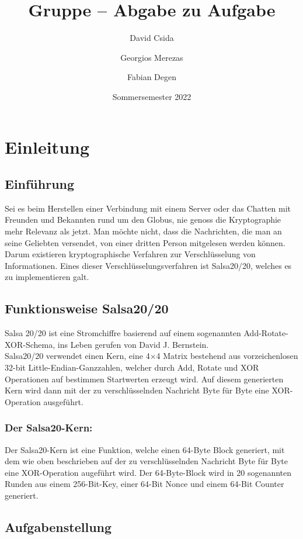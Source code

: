\documentclass[course=erap]{aspdoc}
\author{David Csida \and Georgios Merezas \and Fabian Degen}
\date{Sommersemester 2022} %
\title{Gruppe \theGroup{} -- Abgabe zu Aufgabe \theNumber}
\begin{document}
\maketitle

\section{Einleitung}
\subsection{Einführung}
Sei es beim Herstellen einer Verbindung mit einem Server oder das Chatten mit Freunden und Bekannten rund um den Globus, nie genoss die Kryptographie mehr Relevanz als jetzt.
Man möchte nicht, dass die Nachrichten, die man an seine Geliebten versendet, von einer dritten Person mitgelesen werden können. Darum existieren kryptographische Verfahren zur Verschlüsselung von Informationen.
Eines dieser Verschlüsselungsverfahren ist Salsa20/20, welches es zu implementieren galt.

\subsection{Funktionsweise Salsa20/20}
Salsa 20/20 ist eine Stromchiffre basierend auf einem sogenannten Add-Rotate-XOR-Schema, ins Leben gerufen von David J. Bernstein.
\\Salsa20/20 verwendet einen Kern, eine 4$\times$4 Matrix bestehend aus vorzeichenlosen 32-bit Little-Endian-Ganzzahlen, welcher durch Add, Rotate und XOR Operationen auf bestimmen Startwerten erzeugt wird.
Auf diesem generierten Kern wird dann mit der zu verschlüsselnden Nachricht Byte für Byte eine XOR-Operation ausgeführt.

\subsubsection{Der Salsa20-Kern:}
Der Salsa20-Kern ist eine Funktion, welche einen 64-Byte Block generiert, mit dem wie oben beschrieben auf der zu verschlüsselnden Nachricht Byte für Byte eine XOR-Operation augeführt wird.
Der 64-Byte-Block wird in 20 sogenannten Runden aus einem 256-Bit-Key, einer 64-Bit Nonce und einem 64-Bit Counter generiert.

\subsection{Aufgabenstellung}
\end{document}
